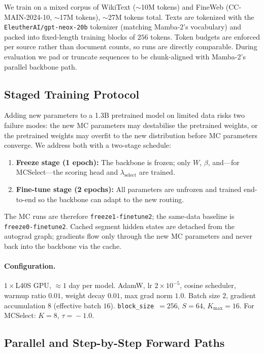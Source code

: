\documentclass{article}
\begin{document}
We train on a mixed corpus of WikiText ($\sim$10M tokens) and FineWeb (CC-MAIN-2024-10, $\sim$17M tokens), $\sim$27M tokens total. Texts are tokenized with the \texttt{EleutherAI/gpt-neox-20b} tokenizer (matching Mamba-2's vocabulary) and packed into fixed-length training blocks of $256$ tokens. Token budgets are enforced per source rather than document counts, so runs are directly comparable. During evaluation we pad or truncate sequences to be chunk-aligned with Mamba-2's parallel backbone path.

\subsection{Staged Training Protocol}
\label{sec:training}

Adding new parameters to a 1.3B pretrained model on limited data risks two failure modes: the new MC parameters may destabilise the pretrained weights, or the pretrained weights may overfit to the new distribution before MC parameters converge. We address both with a two-stage schedule:

\begin{enumerate}
    \itemsep0pt
    \item \textbf{Freeze stage (1 epoch):} The backbone is frozen; only $W$, $\beta$, and---for MCSelect---the scoring head and $\lambda_{\text{select}}$ are trained.
    \item \textbf{Fine-tune stage (2 epochs):} All parameters are unfrozen and trained end-to-end so the backbone can adapt to the new routing.
\end{enumerate}

The MC runs are therefore \texttt{freeze1-finetune2}; the same-data baseline is \texttt{freeze0-finetune2}. Cached segment hidden states are detached from the autograd graph; gradients flow only through the new MC parameters and never back into the backbone via the cache.

\paragraph{Configuration.} $1\!\times\!$L40S GPU, $\approx 1$ day per model. AdamW, lr $2\!\times\!10^{-5}$, cosine scheduler, warmup ratio $0.01$, weight decay $0.01$, max grad norm $1.0$. Batch size $2$, gradient accumulation $8$ (effective batch $16$). \texttt{block\_size}~$=256$, $S\!=\!64$, $K_{\max}\!=\!16$. For MCSelect: $K\!=\!8$, $\tau\!=\!-1.0$.

\subsection{Parallel and Step-by-Step Forward Paths}
\end{document}
